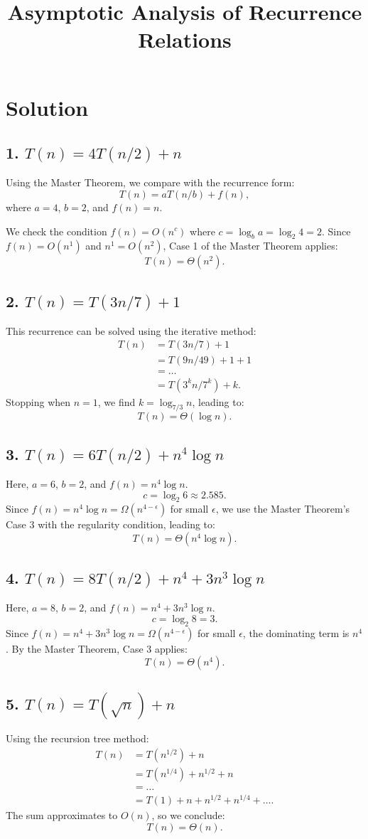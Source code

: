 \documentclass{article}
\begin{document}
\title{Asymptotic Analysis of Recurrence Relations}
\author{}
\date{}
\maketitle

\section*{Solution}

\subsection*{1. \( T(n) = 4T(n/2) + n \)}
Using the Master Theorem, we compare with the recurrence form:
\[
T(n) = aT(n/b) + f(n),
\]
where \( a = 4 \), \( b = 2 \), and \( f(n) = n \).

We check the condition \( f(n) = O(n^c) \) where \( c = \log_b a = \log_2 4 = 2 \).
Since \( f(n) = O(n^1) \) and \( n^1 = O(n^2) \), Case 1 of the Master Theorem applies:
\[
T(n) = \Theta(n^2).
\]

\subsection*{2. \( T(n) = T(3n/7) + 1 \)}
This recurrence can be solved using the iterative method:
\begin{align*}
T(n) &= T(3n/7) + 1 \\
&= T(9n/49) + 1 + 1 \\
&= \dots \\
&= T(3^k n / 7^k) + k.
\end{align*}
Stopping when \( n = 1 \), we find \( k = \log_{7/3} n \), leading to:
\[
T(n) = \Theta(\log n).
\]

\subsection*{3. \( T(n) = 6T(n/2) + n^4 \log n \)}
Here, \( a = 6 \), \( b = 2 \), and \( f(n) = n^4 \log n \).
\[
c = \log_2 6 \approx 2.585.
\]
Since \( f(n) = n^4 \log n = \Omega(n^{4 - \epsilon}) \) for small \( \epsilon \), we use the Master Theorem’s Case 3 with the regularity condition, leading to:
\[
T(n) = \Theta(n^4 \log n).
\]

\subsection*{4. \( T(n) = 8T(n/2) + n^4 + 3n^3 \log n \)}
Here, \( a = 8 \), \( b = 2 \), and \( f(n) = n^4 + 3n^3 \log n \).
\[
c = \log_2 8 = 3.
\]
Since \( f(n) = n^4 + 3n^3 \log n = \Omega(n^{4-\epsilon}) \) for small \( \epsilon \), the dominating term is \( n^4 \). By the Master Theorem, Case 3 applies:
\[
T(n) = \Theta(n^4).
\]

\subsection*{5. \( T(n) = T(\sqrt{n}) + n \)}
Using the recursion tree method:
\begin{align*}
T(n) &= T(n^{1/2}) + n \\
&= T(n^{1/4}) + n^{1/2} + n \\
&= \dots \\
&= T(1) + n + n^{1/2} + n^{1/4} + \dots.
\end{align*}
The sum approximates to \( O(n) \), so we conclude:
\[
T(n) = \Theta(n).
\]
\end{document}
